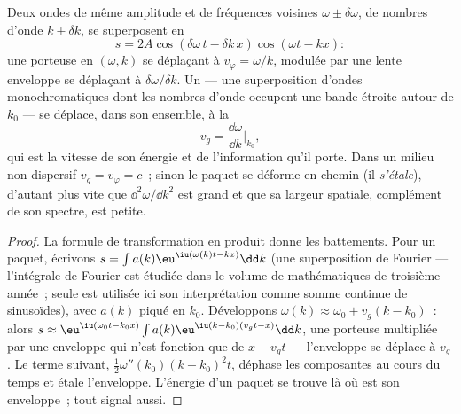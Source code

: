 \begin{proposition}\label{prop:b2:dispersion-wave-packets:group}
Deux ondes de même amplitude et de fréquences voisines $\omega \pm
\delta\omega$, de nombres d'onde $k \pm \delta k$, se superposent en
\[
s = 2A\cos(\delta\omega\,t - \delta k\,x)\cos(\omega t - kx) :
\]
une porteuse en $(\omega, k)$ se déplaçant à $v_\varphi = \omega/k$, modulée par une lente
enveloppe se déplaçant à $\delta\omega/\delta k$. Un \emph{} --- une
superposition d'ondes monochromatiques dont les nombres d'onde occupent une bande étroite
autour de $k_0$ --- se déplace, dans son ensemble, à la \emph{}
\[
v_g = \frac{\dd\omega}{\dd k}\Bigr|_{k_0} ,
\]
qui est la vitesse de son énergie et de l'information qu'il porte.
Dans un milieu non dispersif $v_g = v_\varphi = c$~; sinon le paquet
se déforme en chemin (il \emph{s'étale}), d'autant plus vite que
$\dd^2\omega/\dd k^2$ est grand et que sa largeur spatiale, complément de son spectre,
est petite.
\end{proposition}

\begin{proof}
La formule de transformation en produit donne les battements. Pour un paquet, écrivons $s =
\int a(k)\eu^{\iu(\omega(k)t - kx)}\dd k$ (une superposition de Fourier --- l'intégrale
de Fourier est étudiée dans le volume de mathématiques de troisième année~; seule est utilisée ici
son interprétation comme somme continue de sinusoïdes), avec
$a(k)$ piqué en $k_0$. Développons $\omega(k) \approx \omega_0 + v_g(k - k_0)$~: alors
$s \approx \eu^{\iu(\omega_0t - k_0x)}\int a(k)\eu^{\iu(k - k_0)(v_gt - x)}\dd k$, une
porteuse multipliée par une enveloppe qui n'est fonction que de $x - v_gt$ --- l'enveloppe
se déplace à $v_g$. Le terme suivant, $\tfrac12\omega''(k_0)(k - k_0)^2t$,
déphase les composantes au cours du temps et étale l'enveloppe. L'énergie
d'un paquet se trouve là où est son enveloppe~; tout signal aussi.
\end{proof}

